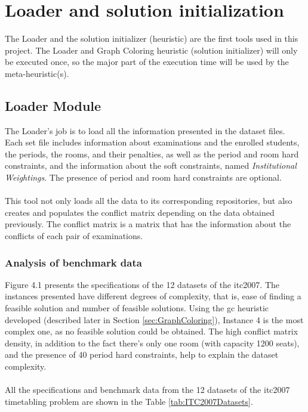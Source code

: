 \chapter{Loader and solution initialization}
\label{sec:SolutionInit}
\thispagestyle{plain}

The Loader and the solution initializer (heuristic) are the first tools used in this project. The Loader and Graph Coloring heuristic (solution initializer) will only be executed once, so the major part of the execution time will be used by the meta-heuristic(s).

\section{Loader Module}
\label{sec:Loader}

The Loader's job is to load all the information presented in the dataset files. Each set file includes information about examinations and the enrolled students, the periods, the rooms, and their penalties, as well as the period and room hard constraints, and the information about the soft constraints, named \textit{Institutional Weightings}. The presence of period and room hard constraints are optional.\\
\\
This tool not only loads all the data to its corresponding repositories, but also creates and populates the conflict matrix depending on the data obtained previously. The conflict matrix is a matrix that has the information about the conflicts of each pair of examinations.

\subsection{Analysis of benchmark data}

Figure 4.1 presents the specifications of the 12 datasets of the \gls{itc2007}. The instances presented have different degrees of complexity, that is, ease of finding a feasible solution and number of feasible solutions. Using the \gls{gc} heuristic developed (described later in Section \ref{sec:GraphColoring}), Instance 4 is the most complex one, as no feasible solution could be obtained. The high conflict matrix density, in addition to the fact there's only one room (with capacity 1200 seats), and the presence of 40 period hard constraints, help to explain the dataset complexity.\\
\\
All the specifications and benchmark data from the 12 datasets of the \gls{itc2007} timetabling problem are shown in the Table \ref{tab:ITC2007Datasets}.

